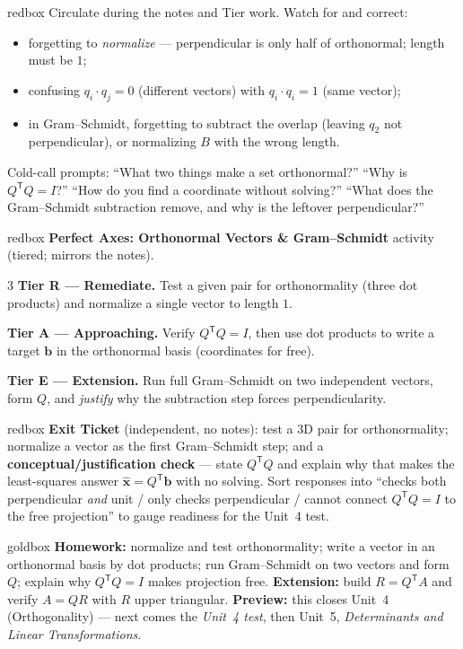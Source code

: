 \documentclass[10pt]{article}
\newcommand{\xx}{\mathbf{x}}
\newcommand{\bb}{\mathbf{b}}
\newcommand{\T}{\mathsf{T}}
\begin{document}
\begin{skillbox}{redbox}
Circulate during the notes and Tier work. Watch for and correct:
\begin{itemize}[leftmargin=1.2em, nosep]
  \item forgetting to \emph{normalize} --- perpendicular is only half of orthonormal; length must be $1$;
  \item confusing $q_i\cdot q_j=0$ (different vectors) with $q_i\cdot q_i=1$ (same vector);
  \item in Gram--Schmidt, forgetting to subtract the overlap (leaving $q_2$ not perpendicular), or normalizing $B$ with the wrong length.
\end{itemize}
Cold-call prompts: ``What two things make a set orthonormal?'' ``Why is $Q^{\T}Q=I$?'' ``How do you find a
coordinate without solving?'' ``What does the Gram--Schmidt subtraction remove, and why is the leftover
perpendicular?''
\end{skillbox}

\begin{skillbox}{redbox}
\textbf{Perfect Axes: Orthonormal Vectors \& Gram--Schmidt} activity (tiered; mirrors the notes).
\begin{multicols}{3}
\textbf{Tier R --- Remediate.} Test a given pair for orthonormality (three dot products) and normalize a
single vector to length $1$.

\columnbreak
\textbf{Tier A --- Approaching.} Verify $Q^{\T}Q=I$, then use dot products to write a target $\bb$ in the
orthonormal basis (coordinates for free).

\columnbreak
\textbf{Tier E --- Extension.} Run full Gram--Schmidt on two independent vectors, form $Q$, and
\emph{justify} why the subtraction step forces perpendicularity.
\end{multicols}
\end{skillbox}

\begin{skillbox}{redbox}
\textbf{Exit Ticket} (independent, no notes): test a $3$D pair for orthonormality; normalize a vector as
the first Gram--Schmidt step; and a \textbf{conceptual/justification check} --- state $Q^{\T}Q$ and explain
why that makes the least-squares answer $\hat{\xx}=Q^{\T}\bb$ with no solving. Sort responses into
``checks both perpendicular \emph{and} unit / only checks perpendicular / cannot connect $Q^{\T}Q=I$ to the
free projection'' to gauge readiness for the Unit~4 test.
\end{skillbox}

\begin{skillbox}{goldbox}
\textbf{Homework:} normalize and test orthonormality; write a vector in an orthonormal basis by dot
products; run Gram--Schmidt on two vectors and form $Q$; explain why $Q^{\T}Q=I$ makes projection free.
\textbf{Extension:} build $R=Q^{\T}A$ and verify $A=QR$ with $R$ upper triangular. \textbf{Preview:} this
closes Unit~4 (Orthogonality) --- next comes the \emph{Unit~4 test}, then Unit~5, \emph{Determinants and
Linear Transformations}.
\end{skillbox}
\end{document}
